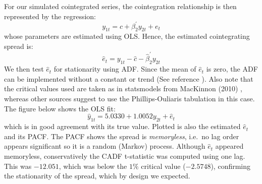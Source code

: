 \documentclass[11pt]{article}
\begin{document}
    For our simulated cointegrated series, the cointegration relationship is
then represented by the regression:
\begin{equation}
y_{1t} = c + \beta_2^\prime y_{2t} + e_t
\end{equation}
whose parameters are estimated using OLS. Hence, the estimated
cointegrating spread is:
\begin{equation}
\hat{e}_t = y_{1t} - \hat{c} - \hat{\beta}_2^\prime y_{2t}
\end{equation}
We then test \(\hat{e}_t\) for stationarity using ADF. Since the mean of
\(\hat{e}_t\) is zero, the ADF can be implemented without a constant or
trend (See reference \cite{refp445}). Also note that the critical values used are taken as in
statsmodels from MacKinnon (2010) \cite{(seeref)}, whereas other sources suggest to use the Phillips-Ouliaris
tabulation in this case.
The figure below shows the OLS fit:
\begin{equation}
\hat{y}_{1t} = 5.0330 + 1.0052 y_{2t} + \hat{e}_t
\end{equation}
which is in good agreement with its true value. Plotted is also the
estimated \(\hat{e}_t\) and its PACF. The PACF shows the spread is
\emph{memoryless}, i.e.~no lag order appears significant so it is a
random (Markov) process.
Although \(\hat{e}_t\) appeared memoryless, conservatively the CADF
t-statistic was computed using one lag. This was \(-12.051\), which was
below the \(1\%\) critical value (\(-2.5748\)), confirming the
stationarity of the spread, which by design we expected.
    \begin{center}
    \end{center}
    { \hspace*{\fill} \\}
    \begin{center}
    \end{center}
    { \hspace*{\fill} \\}
\end{document}
